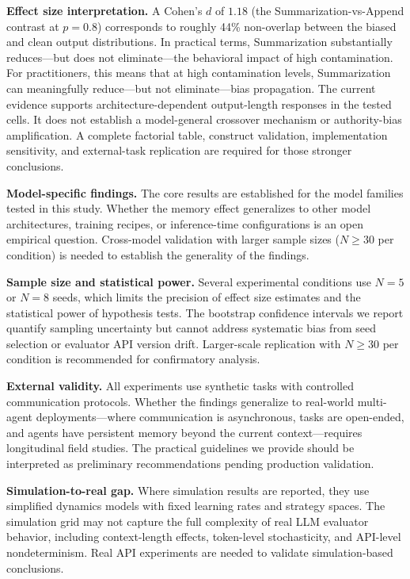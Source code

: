 \documentclass[11pt]{article}
\begin{document}
\textbf{Effect size interpretation.} A Cohen's $d$ of $1.18$ (the Summarization-vs-Append contrast at $p{=}0.8$) corresponds to roughly 44\% non-overlap between the biased and clean output distributions. In practical terms, Summarization substantially reduces---but does not eliminate---the behavioral impact of high contamination. For practitioners, this means that at high contamination levels, Summarization can meaningfully reduce---but not eliminate---bias propagation.
The current evidence supports architecture-dependent output-length responses in the tested cells. It does not establish a model-general crossover mechanism or authority-bias amplification. A complete factorial table, construct validation, implementation sensitivity, and external-task replication are required for those stronger conclusions.




\textbf{Model-specific findings.} The core results are established for the model families tested in this study. Whether the memory effect generalizes to other model architectures, training recipes, or inference-time configurations is an open empirical question. Cross-model validation with larger sample sizes ($N{\geq}30$ per condition) is needed to establish the generality of the findings.

\textbf{Sample size and statistical power.} Several experimental conditions use $N{=}5$ or $N{=}8$ seeds, which limits the precision of effect size estimates and the statistical power of hypothesis tests. The bootstrap confidence intervals we report quantify sampling uncertainty but cannot address systematic bias from seed selection or evaluator API version drift. Larger-scale replication with $N{\geq}30$ per condition is recommended for confirmatory analysis.

\textbf{External validity.} All experiments use synthetic tasks with controlled communication protocols. Whether the findings generalize to real-world multi-agent deployments—where communication is asynchronous, tasks are open-ended, and agents have persistent memory beyond the current context—requires longitudinal field studies. The practical guidelines we provide should be interpreted as preliminary recommendations pending production validation.

\textbf{Simulation-to-real gap.} Where simulation results are reported, they use simplified dynamics models with fixed learning rates and strategy spaces. The simulation grid may not capture the full complexity of real LLM evaluator behavior, including context-length effects, token-level stochasticity, and API-level nondeterminism. Real API experiments are needed to validate simulation-based conclusions.
\end{document}
